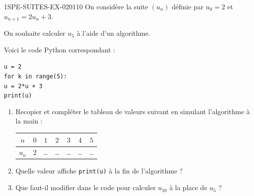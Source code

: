 \begin{exercice}{1SPE-SUITES-EX-020}{1}{10}
On considère la suite $(u_n)$ définie par $u_0 = 2$ et $u_{n+1} = 2u_n + 3$.

On souhaite calculer $u_5$ à l'aide d'un algorithme.

Voici le code Python correspondant :

\begin{center}
\texttt{u = 2}\\
\texttt{for k in range(5):}\\
\texttt{\quad\quad u = 2*u + 3}\\
\texttt{print(u)}
\end{center}

\begin{enumerate}
  \item Recopier et compléter le tableau de valeurs suivant en simulant l'algorithme à la main :

  \medskip
  \begin{tabular}{|c|c|c|c|c|c|c|}
    \hline
    $n$ & $0$ & $1$ & $2$ & $3$ & $4$ & $5$ \\
    \hline
    $u_n$ & $2$ & \dots & \dots & \dots & \dots & \dots \\
    \hline
  \end{tabular}
  \medskip

  \item Quelle valeur affiche \texttt{print(u)} à la fin de l'algorithme ?
  \item Que faut-il modifier dans le code pour calculer $u_{10}$ à la place de $u_5$ ?
\end{enumerate}
\end{exercice}
